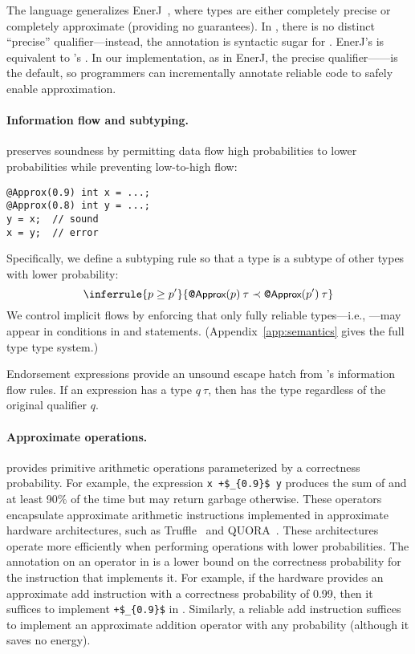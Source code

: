 {The language generalizes EnerJ~\cite{enerj}, where types are either
completely precise or completely approximate (providing no guarantees).
In \lang, there is no distinct ``precise'' qualifier---instead, the
 annotation is syntactic sugar for .
EnerJ's  is equivalent to \lang's .
In our implementation, as in EnerJ, the precise
qualifier------is the default, so programmers can
incrementally annotate reliable code to safely enable approximation.

\paragraph{Information flow and subtyping.}
\lang preserves soundness by permitting data flow high probabilities
to lower probabilities while preventing low-to-high flow:
%
\begin{lstlisting}
@Approx(0.9) int x = ...;
@Approx(0.8) int y = ...;
y = x;  // sound
x = y;  // error
\end{lstlisting}
%
Specifically, we define a subtyping rule so that a type is a subtype of
other types with lower probability:
%
\[
    \inferrule
        {p \geq p'}
        {\ApproxN{p} \> \tau
         \prec \ApproxN{p'} \> \tau}
\]
%
We control implicit flows by enforcing that only fully reliable types---i.e.,
---may appear in conditions in  and
 statements.
(Appendix~\ref{app:semantics} gives the full type type system.)

Endorsement expressions provide an unsound escape hatch from \lang's
information flow rules.
If an expression  has a type $q \> \tau$, then 
has the type  regardless of the original qualifier
$q$.


\paragraph{Approximate operations.}
\lang provides primitive arithmetic operations parameterized by a correctness
probability.
For example, the expression \lstinline!x +$_{0.9}$ y! produces the sum of 
and  at least 90\% of the time but may return garbage otherwise.
These operators encapsulate approximate arithmetic instructions implemented in
approximate hardware architectures, such as Truffle~\cite{truffle} and
QUORA~\cite{quora}.
These architectures operate more efficiently when performing operations with
lower probabilities.
The annotation on an operator in \lang is a lower bound on the
correctness probability for the instruction that implements it.
For example, if the hardware provides an approximate add instruction
with a correctness probability of 0.99, then it suffices to implement
\lstinline!+$_{0.9}$! in \lang.
Similarly, a reliable add instruction suffices to implement an approximate
addition operator with any probability (although it saves no energy).

}

